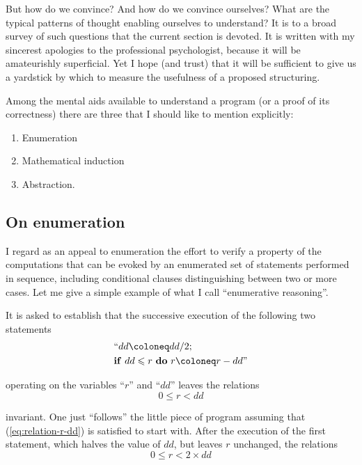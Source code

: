 \documentclass[twoside,11pt]{book}
\begin{document}
But how do we convince? And how do we convince ourselves? What are the typical patterns of thought enabling ourselves to understand? It is to a broad survey of such questions that the current section is devoted. It is written with my sincerest apologies to the professional psychologist, because it will be amateurishly superficial. Yet I hope (and trust) that it will be sufficient to give us a yardstick by which to measure the usefulness of a proposed structuring.

Among the mental aids available to understand a program (or a proof of its correctness) there are three that I should like to mention explicitly:

\begin{enumerate}[wide, nosep, label=(\arabic*)]
\item Enumeration
\item Mathematical induction
\item Abstraction.
\end{enumerate}

\subsection{On enumeration}
\label{subsec:enumeration}

I regard as an appeal to enumeration the effort to verify a property of the computations that can be evoked by an enumerated set of statements performed in sequence, including conditional clauses distinguishing between two or more cases. Let me give a simple example of what I call ``enumerative reasoning''.

It is asked to establish that the successive execution of the following two statements
\begin{equation*}
	\begin{split}
		&\text{``}dd \coloneq dd/2; \\
		&\text{\textbf{if} } dd \leqslant r \text{ \textbf{do} } r \coloneq r - dd\text{''}
	\end{split}
\end{equation*}

\noindent
operating on the variables ``$r$'' and ``$dd$'' leaves the relations
\begin{equation}
	\label{eq:relation-r-dd}
	0 \leqslant r < dd
\end{equation}

\noindent
invariant. One just ``follows'' the little piece of program assuming that (\ref{eq:relation-r-dd}) is satisfied to start with. After the execution of the first statement, which halves the value of $dd$, but leaves $r$ unchanged, the relations
\begin{equation}
	\label{eq:relation-r-2dd}
	0 \leqslant r < 2\times dd
\end{equation}
\end{document}
